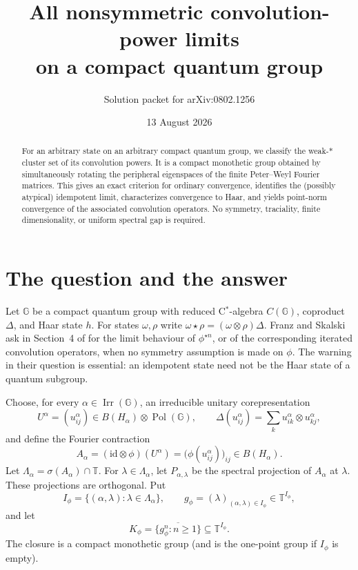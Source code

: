 \documentclass[11pt]{article}
\title{All nonsymmetric convolution-power limits\\on a compact quantum group}
\author{Solution packet for arXiv:0802.1256}
\date{13 August 2026}
\theoremstyle{remark}
\newcommand{\T}{\mathbb T}
\newcommand{\Pol}{\operatorname{Pol}}
\newcommand{\Irr}{\operatorname{Irr}}
\newcommand{\id}{\mathrm{id}}
\begin{document}
\maketitle

\begin{abstract}
For an arbitrary state on an arbitrary compact quantum group, we classify the
weak-$*$ cluster set of its convolution powers.  It is a compact monothetic
group obtained by simultaneously rotating the peripheral eigenspaces of the
finite Peter--Weyl Fourier matrices.  This gives an exact criterion for
ordinary convergence, identifies the (possibly atypical) idempotent limit,
characterizes convergence to Haar, and yields point-norm convergence of the
associated convolution operators.  No symmetry, traciality, finite
dimensionality, or uniform spectral gap is required.
\end{abstract}

\section{The question and the answer}

Let $\mathbb G$ be a compact quantum group with reduced C$^*$-algebra $C(\mathbb G)$,
coproduct $\Delta$, and Haar state $h$.  For states $\omega,\rho$ write
$\omega\star\rho=(\omega\otimes\rho)\Delta$.  Franz and Skalski ask in
Section~4 of \cite{FS} for the limit behaviour of $\phi^{\star n}$, or of the
corresponding iterated convolution operators, when no symmetry assumption is
made on $\phi$.  The warning in their question is essential: an idempotent
state need not be the Haar state of a quantum subgroup.

Choose, for every $\alpha\in\Irr(\mathbb G)$, an irreducible unitary
corepresentation
\[
 U^\alpha=(u^\alpha_{ij})\in
 B(H_\alpha)\otimes\Pol(\mathbb G),
 \qquad
 \Delta(u^\alpha_{ij})=\sum_k u^\alpha_{ik}\otimes u^\alpha_{kj},
\]
and define the Fourier contraction
\[
 A_\alpha=(\id\otimes\phi)(U^\alpha)
       =\bigl(\phi(u^\alpha_{ij})\bigr)_{ij}\in B(H_\alpha).
\]
Let $\Lambda_\alpha=\sigma(A_\alpha)\cap\T$.  For
$\lambda\in\Lambda_\alpha$, let $P_{\alpha,\lambda}$ be the spectral
projection of $A_\alpha$ at $\lambda$.  These projections are orthogonal.
Put
\[
 I_\phi=\{(\alpha,\lambda):\lambda\in\Lambda_\alpha\},\qquad
 g_\phi=(\lambda)_{(\alpha,\lambda)\in I_\phi}\in\T^{I_\phi},
\]
and let
\[
 K_\phi=\overline{\{g_\phi^n:n\geq1\}}\subseteq\T^{I_\phi}.
\]
The closure is a compact monothetic group (and is the one-point group if
$I_\phi$ is empty).
\end{document}
